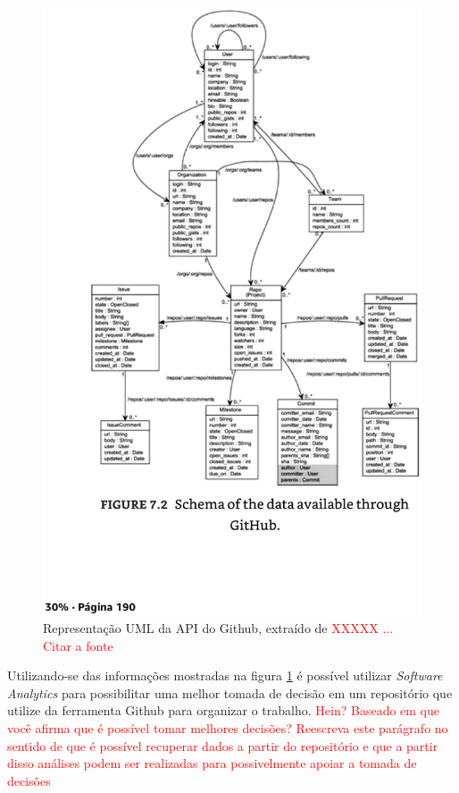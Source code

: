 \begin{figure}[!h]
    \centering
        \includegraphics[keepaspectratio=true,scale=0.4]{figuras/github_api_diagram.eps}
    \caption{Representação UML da API do Github, extraído de \textcolor{red}{XXXXX ... Citar a fonte}}
    \label{fig:github_api}
\end{figure}


Utilizando-se das informações mostradas na figura \ref{fig:github_api} é possível utilizar \textit{Software Analytics} para possibilitar uma melhor tomada de decisão em um repositório que utilize da ferramenta Github para organizar o trabalho. \textcolor{red}{Hein? Baseado em que você afirma que é possível tomar melhores decisões? Reescreva este parágrafo no sentido de que é possível recuperar dados a partir do repositório e que a partir disso análises podem ser realizadas para possivelmente apoiar a tomada de decisões}

